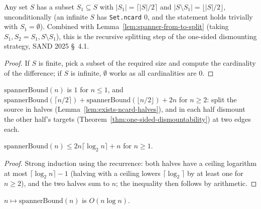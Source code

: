 \begin{lemma}
  \label{lem:exists-ncard-halves}
  \leanok
  Any set $S$ has a subset $S_1 \subseteq S$ with $|S_1| = \lceil |S|/2 \rceil$
  and $|S \setminus S_1| = \lfloor |S|/2 \rfloor$, unconditionally (an infinite
  $S$ has \texttt{Set.ncard} $0$, and the statement holds trivially with
  $S_1 = \emptyset$). Combined with Lemma~\ref{lem:spanner-from-to-split}
  (taking $S_1, S_2 = S_1, S \setminus S_1$), this is the recursive splitting
  step of the one-sided dismounting strategy, SAND 2025 \S~4.1.
\end{lemma}

\begin{proof}
  \leanok
  If $S$ is finite, pick a subset of the required size and compute the cardinality of the difference; if $S$ is infinite, $\emptyset$ works as all cardinalities are $0$.
\end{proof}

\begin{definition}
  \label{def:spanner-bound}
  \leanok
  $\mathrm{spannerBound}(n)$ is $1$ for $n \le 1$, and
  $\mathrm{spannerBound}(\lceil n/2 \rceil) + \mathrm{spannerBound}(\lfloor n/2
  \rfloor) + 2n$ for $n \ge 2$: split the source in halves
  (Lemma~\ref{lem:exists-ncard-halves}), and in each half dismount the other
  half's targets (Theorem~\ref{thm:one-sided-dismountability}) at two edges
  each.
\end{definition}

\begin{lemma}
  \label{lem:spanner-bound-closed-form}
  \leanok
  $\mathrm{spannerBound}(n) \le 2n \lceil \log_2 n \rceil + n$ for $n \ge 1$.
\end{lemma}

\begin{proof}
  \leanok
  Strong induction using the recurrence: both halves have a ceiling logarithm at most $\lceil \log_2 n\rceil - 1$ (halving with a ceiling lowers $\lceil\log_2\rceil$ by at least one for $n \ge 2$), and the two halves sum to $n$; the inequality then follows by arithmetic.
\end{proof}

\begin{theorem}
  \label{thm:spanner-bound-isBigO}
  \leanok
  $n \mapsto \mathrm{spannerBound}(n)$ is $O(n \log n)$.
\end{theorem}

